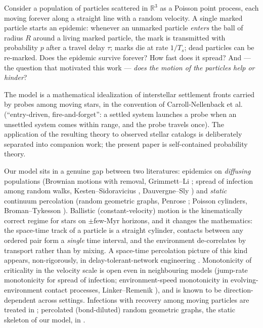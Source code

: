 \documentclass[11pt]{article}
\newcommand{\R}{\mathbb{R}}
\newcommand{\Ts}{T_s}
\begin{document}
Consider a population of particles scattered in $\R^3$ as a Poisson point
process, each moving forever along a straight line with a random velocity.
A single marked particle starts an epidemic: whenever an unmarked particle
\emph{enters} the ball of radius $R$ around a living marked particle, the
mark is transmitted with probability $p$ after a travel delay $\tau$; marks
die at rate $1/\Ts$; dead particles can be re-marked. Does the epidemic
survive forever? How fast does it spread? And --- the question that motivated
this work --- \emph{does the motion of the particles help or hinder}?

The model is a mathematical idealization of interstellar settlement fronts
carried by probes among moving stars, in the convention of
Carroll-Nellenback et al.~\cite{cn19} (``entry-driven, fire-and-forget'':
a settled system launches a probe when an unsettled system comes within
range, and the probe travels once). The application of the resulting
theory to observed stellar catalogs is deliberately separated into
companion work; the present paper is self-contained probability theory.

Our model sits in a genuine gap between two literatures: epidemics on
\emph{diffusing} populations (Brownian motions with removal, Grimmett--Li
\cite{grimmettli}; spread of infection among random walks, Kesten--Sidoravicius
\cite{ks05,ks08}, Dauvergne--Sly \cite{dauvergnesly}) and \emph{static}
continuum percolation (random geometric graphs, Penrose \cite{penrose};
Poisson cylinders, Broman--Tykesson \cite{bromantykesson}). Ballistic
(constant-velocity) motion is the kinematically correct regime for stars on
$\pm$few-Myr horizons, and it changes the mathematics: the space-time track
of a particle is a straight cylinder, contacts between any ordered pair form
a \emph{single} time interval, and the environment de-correlates by transport
rather than by mixing. A space-time percolation picture of this kind appears,
non-rigorously, in delay-tolerant-network engineering \cite{hyytiaott}.
Monotonicity of criticality in the velocity scale is open even in
neighbouring models (jump-rate monotonicity for spread of infection;
environment-speed monotonicity in evolving-environment contact processes,
Linker--Remenik \cite{linkerremenik}), and is known to be
direction-dependent across settings. Infections with recovery among moving
particles are treated in \cite{baldassostauffer}; percolated (bond-diluted)
random geometric graphs, the static skeleton of our model, in
\cite{franceschetti,lichev}.
\end{document}

